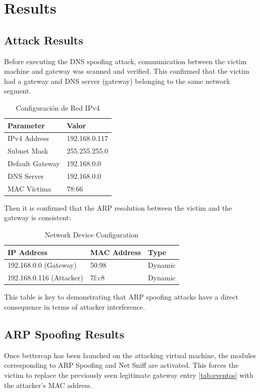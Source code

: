 \documentclass[conference]{IEEEtran}
\begin{document}
\section{Results}
\subsection{Attack Results}
Before executing the DNS spoofing attack, communication between the victim machine and gateway was scanned and verified. This confirmed that the victim had a gateway and DNS server (gateway) belonging to the same network segment.
\begin{table}[htbp]
\caption{Configuración de Red IPv4}
\label{tab:configred}
\begin{center}
\begin{tabular}{@{}p{3.5cm} p{3cm}@{}} \hline
\textbf{Parameter} & \textbf{Valor} \\ \hline
IPv4 Address & 192.168.0.117 \\
Subnet Mask & 255.255.255.0 \\
Default Gateway & 192.168.0.0 \\
DNS Server & 192.168.0.0 \\
MAC Víctima & 78:66 \\
\hline
\end{tabular}
\end{center}
\end{table}


Then it is confirmed that the ARP resolution between the victim and the gateway is consistent:

\begin{table}[htbp]
\caption{Network Device Configuration}
\label{tab:devices}
\begin{center}
\begin{tabular}{@{}p{3cm} p{3cm} p{1.5cm}@{}} \hline
\textbf{IP Address} & \textbf{MAC Address} & \textbf{Type} \\ \hline
192.168.0.0 (Gateway) & 50:98 & Dynamic \\
192.168.0.116 (Attacker) & 7f:c8 & Dynamic \\
\hline
\end{tabular}
\end{center}
\end{table}


This table is key to demonstrating that ARP spoofing attacks have a direct consequence in terms of attacker interference.

\subsection{ARP Spoofing Results}
Once bettercap has been launched on the attacking virtual machine, the modules corresponding to ARP Spoofing and Net Sniff are activated. This forces the victim to replace the previously seen legitimate gateway entry \ref{tab:eventos} with the attacker's MAC address.    
\end{document}

